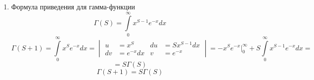 \documentclass[12pt]{article}
\let\oldint\int
\let\oldlim\lim
\renewcommand{\int}{\oldint\limits}
\renewcommand{\lim}{\oldlim\limits}
\begin{document}
\begin{enumerate}
\begin{adjustwidth}{1.5em}{1.5em}
          Докажем, что $\Gamma'(S)$ сходится.\\
          Рассмотрим
          \begin{gather*}
              \int_{0}^{1}x^{S-1}\ln(x)dx = \begin{vmatrix*}
                  u &= ln(x) & du &= \frac{dx}{x} \\
                  dv &= x^{S-1}dx & v &= \frac{x^S}{S}
              \end{vmatrix*}
              = \ln (x) \frac{x^S}{S}\Big|^1_0 - \frac{1}{S}\int_{0}^{1}x^{S-1}dx =\\
              = \lim_{\varepsilon \to 0} \Big[ - \underset{= 0}{\frac{\ln (\varepsilon) \varepsilon^{S}}{S}} + 0 \Big] - \frac{1}{S^2}x^S\Big|^1_0 = -\frac{1}{S^2} \text{ сх. при }S>0
          \end{gather*}
          Рассмотрим $\lim_{x \to 0}\frac{e^{-x}x^{S-1}\ln (x)}{x^{S-1}ln(x)} = 1 \implies \int_{0}^{1}e^{-x}x^{S-1}\ln(x)dx$ сх. при $S > 0$.\\
          Рассмотрим $\int_{1}^{\infty}\frac{dx}{x^2}$ сх.\\
          Рассмотрим
          \[ \lim_{x \to \infty} \frac{e^{-x}x^{S-1}\ln x}{\frac{1}{x^2}} = \lim_{x \to \infty} \frac{x^{S+1}\ln (x)}{e^x} \overset{\text{пр. Лап.}}{=} \dots = 0 \implies \int_{1}^{\infty}e^{-x}x^{S-1}\ln(x) dx \text{ сх. при }\forall S \]
          \underline{Итог:} $\int_{0}^{\infty}e^{-x}x^{S-1}\ln(x)dx$ сх. при $S > 0$.
      \end{adjustwidth}
      \item Формула приведения для гамма-функции
      \[ \Gamma(S) = \int_{0}^{\infty}x^{S-1}e^{-x}dx \]
      \[ \Gamma(S+1) = \int_{0}^{\infty}x^S e^{-x} dx = \begin{vmatrix*}
          u &= x^S & du &= Sx^{S-1}dx\\
          dv &= e^{-x}dx & v &= e^{-x}
      \end{vmatrix*} = -x^S e^{-x}\Big|^\infty_0 + S\int_{0}^{\infty}x^{S-1}e^{-x}dx = \]
      \[ = S\Gamma(S) \]
      \[ \boxed{\Gamma(S+1) = S\Gamma(S)} \]
    \end{enumerate}
    
\end{document}
